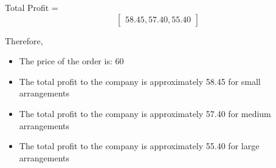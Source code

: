 \documentclass{article}
\begin{document}
Total Profit = \[
\begin{bmatrix}
58.45, 57.40, 55.40
\end{bmatrix}
\]

Therefore,

\begin{itemize}
    \item The price of the order is: \textdollar{}60
    \item The total profit to the company is approximately \textdollar{}58.45 for small arrangements
    \item The total profit to the company is approximately \textdollar{}57.40 for medium arrangements
    \item The total profit to the company is approximately \textdollar{}55.40 for large arrangements
\end{itemize}
\end{document}
